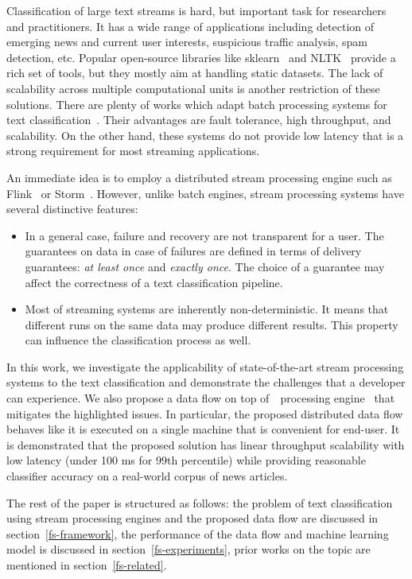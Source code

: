 \label {fs-short-intro}

Classification of large text streams is hard, but important task for researchers and practitioners. It has a wide range of applications including detection of emerging news and current user interests, suspicious traffic analysis, spam detection, etc. Popular open-source libraries like sklearn~\cite{sklearn_api} and NLTK~\cite{bird2009natural} provide a rich set of tools, but they mostly aim at handling static datasets. The lack of scalability across multiple computational units is another restriction of these solutions. There are plenty of works which adapt batch processing systems for text classification~\cite{semberecki2016distributed, svyatkovskiy2016large, baltas2016apache, Nodarakis2016LargeSS}. Their advantages are fault tolerance, high throughput, and scalability. On the other hand, these systems do not provide low latency that is a strong requirement for most streaming applications.

An immediate idea is to employ a distributed stream processing engine such as Flink~\cite{Carbone:2017:SMA:3137765.3137777} or Storm~\cite{apache:storm}. However, unlike batch engines, stream processing systems have several distinctive features: 

\begin{itemize}
    \item In a general case, failure and recovery are not transparent for a user. The guarantees on data in case of failures are defined in terms of delivery guarantees: {\em at least once} and {\em exactly once}. The choice of a guarantee may affect the correctness of a text classification pipeline.
    \item Most of streaming systems are inherently non-deterministic. It means that different runs on the same data may produce different results. This property can influence the classification process as well.
\end{itemize}

In this work, we investigate the applicability of state-of-the-art stream processing systems to the text classification and demonstrate the challenges that a developer can experience. We also propose a data flow on top of~\FlameStream\ processing engine~\cite{we2018beyondmr, we2018adbis} that mitigates the highlighted issues. In particular, the proposed distributed data flow behaves like it is executed on a single machine that is convenient for end-user. It is demonstrated that the proposed solution has linear throughput scalability with low latency (under 100 ms for 99th percentile) while providing reasonable classifier accuracy on a real-world corpus of news articles.

The rest of the paper is structured as follows: the problem of text classification using stream processing engines and the proposed data flow are discussed in section~\ref{fs-framework}, the performance of the data flow and machine learning model is discussed in section~\ref{fs-experiments}, prior works on the topic are mentioned in section~\ref{fs-related}.
